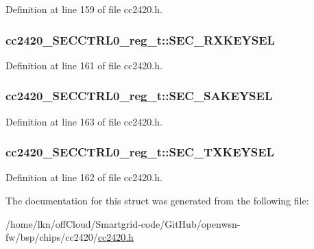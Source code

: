 Definition at line 159 of file cc2420.\+h.

\subsubsection[{\texorpdfstring{S\+E\+C\+\_\+\+R\+X\+K\+E\+Y\+S\+EL}{SEC_RXKEYSEL}}]{ cc2420\+\_\+\+S\+E\+C\+C\+T\+R\+L0\+\_\+reg\+\_\+t\+::\+S\+E\+C\+\_\+\+R\+X\+K\+E\+Y\+S\+EL}\hypertarget{structcc2420___s_e_c_c_t_r_l0__reg__t_a1e790fdbb213abdac47b1deb42012ed2}{}\label{structcc2420___s_e_c_c_t_r_l0__reg__t_a1e790fdbb213abdac47b1deb42012ed2}


Definition at line 161 of file cc2420.\+h.

\subsubsection[{\texorpdfstring{S\+E\+C\+\_\+\+S\+A\+K\+E\+Y\+S\+EL}{SEC_SAKEYSEL}}]{ cc2420\+\_\+\+S\+E\+C\+C\+T\+R\+L0\+\_\+reg\+\_\+t\+::\+S\+E\+C\+\_\+\+S\+A\+K\+E\+Y\+S\+EL}\hypertarget{structcc2420___s_e_c_c_t_r_l0__reg__t_a63964c08e9b4c830a4096bcbf0a29042}{}\label{structcc2420___s_e_c_c_t_r_l0__reg__t_a63964c08e9b4c830a4096bcbf0a29042}


Definition at line 163 of file cc2420.\+h.

\subsubsection[{\texorpdfstring{S\+E\+C\+\_\+\+T\+X\+K\+E\+Y\+S\+EL}{SEC_TXKEYSEL}}]{ cc2420\+\_\+\+S\+E\+C\+C\+T\+R\+L0\+\_\+reg\+\_\+t\+::\+S\+E\+C\+\_\+\+T\+X\+K\+E\+Y\+S\+EL}\hypertarget{structcc2420___s_e_c_c_t_r_l0__reg__t_a2ad0689705838efbe91aeec2f72d5f63}{}\label{structcc2420___s_e_c_c_t_r_l0__reg__t_a2ad0689705838efbe91aeec2f72d5f63}


Definition at line 162 of file cc2420.\+h.



The documentation for this struct was generated from the following file\+:\begin{DoxyCompactItemize}
\item 
/home/lkn/off\+Cloud/\+Smartgrid-\/code/\+Git\+Hub/openwsn-\/fw/bsp/chips/cc2420/\hyperlink{cc2420_8h}{cc2420.\+h}\end{DoxyCompactItemize}
